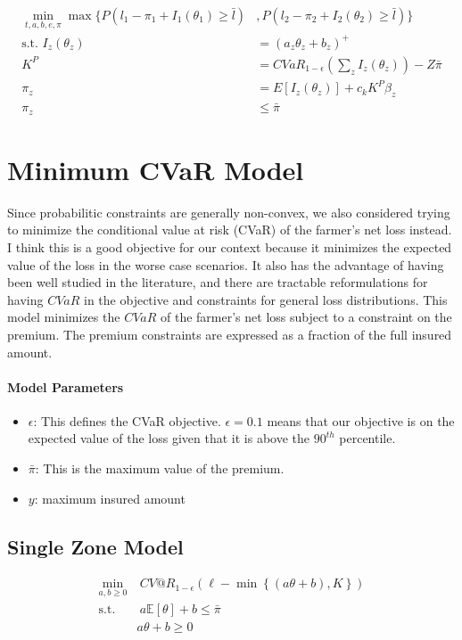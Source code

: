\documentclass[11pt]{article}
\begin{document}
\begin{align}
    \min_{t,a,b,e,\pi} \max \{ P(l_1 - \pi_1 +I_1(\theta_1) \geq \bar{l})&,P(l_2 - \pi_2 +I_2(\theta_2) \geq \bar{l})\}\\
    \text{s.t.   } I_z(\theta_z) &= (a_z\theta_z + b_z)^+\\
    K^P &= CVaR_{1-\epsilon}\left (\sum_z I_z(\theta_z) \right ) - Z\bar{\pi}\\
    \pi_z &= E[I_z(\theta_z)]+c_k K^P \beta_z\\
    \pi_z &\leq \bar{\pi}
\end{align}

\section{Minimum CVaR Model}
Since probabilitic constraints are generally non-convex, we also considered trying to minimize the conditional value at risk (CVaR) of the farmer's net loss instead. I think this is a good objective for our context because it minimizes the expected value of the loss in the worse case scenarios. It also has the advantage of having been well studied in the literature, and there are tractable reformulations for having $CVaR$ in the objective and constraints for general loss distributions. This model minimizes the $CVaR$ of the farmer's net loss subject to a constraint on the premium. The premium constraints are expressed as a fraction of the full insured amount. 

\paragraph*{Model Parameters}
\begin{itemize}
    \item $\epsilon$: This defines the CVaR objective. $\epsilon = 0.1$ means that our objective is on the expected value of the loss given that it is above the $90^{th}$ percentile. 
    \item $\bar{\pi}$: This is the maximum value of the premium. 
    \item $y$: maximum insured amount
\end{itemize}

\subsection*{Single Zone Model}

\begin{align}
    \min_{a,b\geq 0} &\ CV@R_{1-\epsilon}\left(\ell  - \min\left\{(a\theta + b), K\right\} \right)\\
    \text{s.t.   } &\   a \mathbb{E} \left[\theta \right] + b\label{eq-02} \leq \bar{\pi}\\
     & a\theta + b \geq 0 
\end{align}
\end{document}
